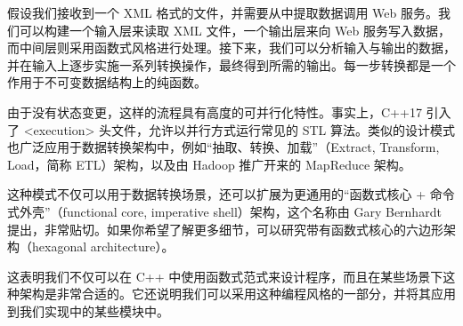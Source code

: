 假设我们接收到一个 XML 格式的文件，并需要从中提取数据调用 Web 服务。我们可以构建一个输入层来读取 XML 文件，一个输出层来向 Web 服务写入数据，而中间层则采用函数式风格进行处理。接下来，我们可以分析输入与输出的数据，并在输入上逐步实施一系列转换操作，最终得到所需的输出。每一步转换都是一个作用于不可变数据结构上的纯函数。

由于没有状态变更，这样的流程具有高度的可并行化特性。事实上，C++17 引入了 <execution> 头文件，允许以并行方式运行常见的 STL 算法。类似的设计模式也广泛应用于数据转换架构中，例如“抽取、转换、加载”（Extract, Transform, Load，简称 ETL）架构，以及由 Hadoop 推广开来的 MapReduce 架构。

这种模式不仅可以用于数据转换场景，还可以扩展为更通用的“函数式核心 + 命令式外壳”（functional core, imperative shell）架构，这个名称由 Gary Bernhardt 提出，非常贴切。如果你希望了解更多细节，可以研究带有函数式核心的六边形架构（hexagonal architecture）。

这表明我们不仅可以在 C++ 中使用函数式范式来设计程序，而且在某些场景下这种架构是非常合适的。它还说明我们可以采用这种编程风格的一部分，并将其应用到我们实现中的某些模块中。


























